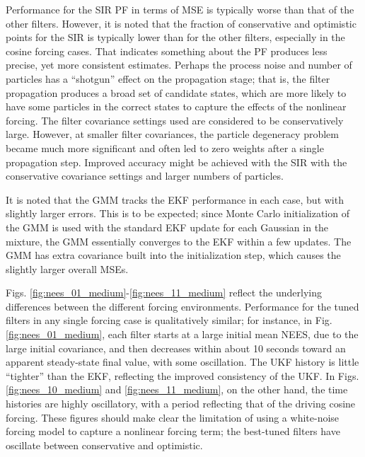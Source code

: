 \documentclass[]{article}
\begin{document}
Performance for the SIR PF in terms of MSE is typically worse than that of the other filters. However, it is noted that the fraction of conservative and optimistic points for the SIR is typically lower than for the other filters, especially in the cosine forcing cases. That indicates something about the PF produces less precise, yet more consistent estimates. Perhaps the process noise and number of particles has a ``shotgun'' effect on the propagation stage; that is, the filter propagation produces a broad set of candidate states, which are more likely to have some particles in the correct states to capture the effects of the nonlinear forcing. The filter covariance settings used are considered to be conservatively large. However, at smaller filter covariances, the particle degeneracy problem became much more significant and often led to zero weights after a single propagation step. Improved  accuracy might be achieved with the SIR with the conservative covariance settings and larger numbers of particles.

It is noted that the GMM tracks the EKF performance in each case, but with slightly larger errors. This is to be expected; since Monte Carlo initialization of the GMM is used with the standard EKF update for each Gaussian in the mixture, the GMM essentially converges to the EKF within a few updates. The GMM has extra covariance built into the initialization step, which causes the slightly larger overall MSEs.

Figs. \ref{fig:nees_01_medium}-\ref{fig:nees_11_medium} reflect the underlying differences between the different forcing environments. Performance for the tuned filters in any single forcing case is qualitatively similar; for instance, in Fig. \ref{fig:nees_01_medium}, each filter starts at a large initial mean NEES, due to the large initial covariance, and then decreases within about 10 seconds toward an apparent steady-state final value, with some oscillation. The UKF history is little ``tighter'' than the EKF, reflecting the improved consistency of the UKF. In Figs. \ref{fig:nees_10_medium} and \ref{fig:nees_11_medium}, on the other hand, the time histories are highly oscillatory, with a period reflecting that of the driving cosine forcing. These figures should make clear the limitation of using a white-noise forcing model to capture a nonlinear forcing term; the best-tuned filters have oscillate between conservative and optimistic.
\end{document}
